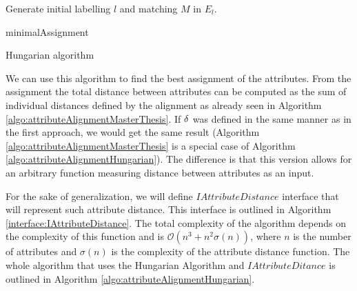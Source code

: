\IncMargin{1em}
\begin{algorithm}
\BlankLine
Generate initial labelling $l$ and matching $M$ in $E_l.$ \;

\Return minimalAssignment\;
\caption{Hungarian algorithm}\label{algo:hungarianAlgorithm}
\end{algorithm}\DecMargin{1em}


We can use this algorithm to find the best assignment of the attributes. From the assignment the total distance between attributes can be computed as the sum of individual distances defined by the alignment as already seen in Algorithm \ref{algo:attributeAlignmentMasterThesis}. If  $\delta$ was defined in the same manner as in the first approach, we would get the same result (Algorithm \ref{algo:attributeAlignmentMasterThesis} is a special case of Algorithm \ref{algo:attributeAlignmentHungarian}). The difference is that this version allows for an arbitrary function measuring distance between attributes as an input.

For the sake of generalization, we will define $IAttributeDistance$ interface that will represent such attribute distance. This interface is outlined in Algorithm \ref{interface:IAttributeDistance}. The total complexity of the algorithm depends on the complexity of this function and is $\mathcal{O}(n^3+n^2\sigma(n))$, where $n$ is the number of attributes and $\sigma(n)$ is the complexity of the attribute distance function. The whole algorithm that uses the Hungarian Algorithm and $IAttributeDitance$ is outlined in Algorithm \ref{algo:attributeAlignmentHungarian}.


